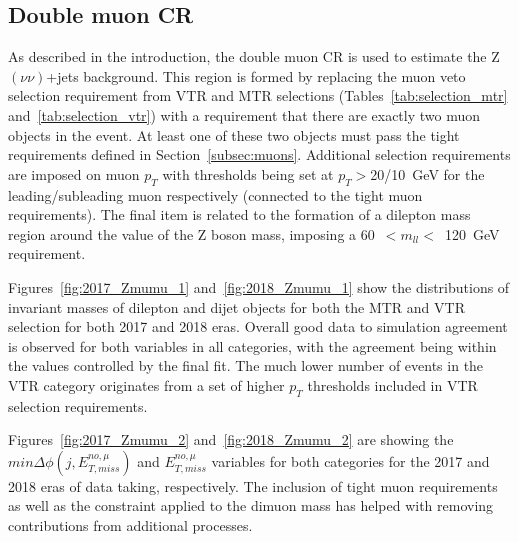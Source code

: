 \subsection{Double muon CR}
\hspace{10pt} As described in the introduction, the double muon CR is used to estimate the Z$(\nu\nu)$+jets background. This region is formed by replacing the muon veto selection requirement from VTR and MTR selections (Tables~\ref{tab:selection_mtr} and~\ref{tab:selection_vtr}) with a requirement that there are exactly two muon objects in the event. At least one of these two objects must pass the tight requirements defined in Section~\ref{subsec:muons}. Additional selection requirements are imposed on muon $p_T$ with thresholds being set at $p_T>$20/10~GeV for the leading/subleading muon respectively (connected to the tight muon requirements). The final item is related to the formation of a dilepton mass region around the value of the Z boson mass, imposing a 60~$<m_{ll}<$~120~GeV requirement.

\hspace{10pt} Figures~\ref{fig:2017_Zmumu_1} and~\ref{fig:2018_Zmumu_1} show the distributions of invariant masses of dilepton and dijet objects for both the MTR and VTR selection for both 2017 and 2018 eras. Overall good data to simulation agreement is observed for both variables in all categories, with the agreement being within the values controlled by the final fit. The much lower number of events in the VTR category originates from a set of higher $p_T$ thresholds included in VTR selection requirements.

\hspace{10pt} Figures~\ref{fig:2017_Zmumu_2} and~\ref{fig:2018_Zmumu_2} are showing the $min\Delta\phi(j, E_{T,miss}^{no,\mu})$ and $E_{T,miss}^{no,\mu}$ variables for both categories for the 2017 and 2018 eras of data taking, respectively. The inclusion of tight muon requirements as well as the constraint applied to the dimuon mass has helped with removing contributions from additional processes.

